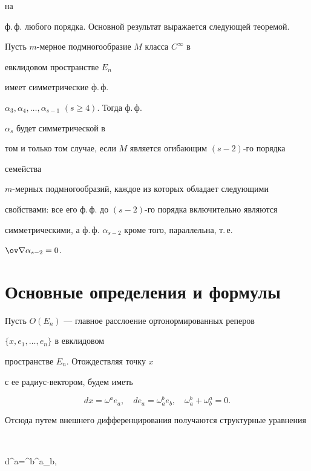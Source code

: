 на 


ф.\,ф. любого порядка. Основной результат выражается следующей теоремой. 


 


\begin{thm} Пусть $m$-мерное подмногообразие $M$ класса $C^\infty$ в 


евклидовом пространстве $E_n$ 


имеет симметрические ф.\,ф. 


$\alpha_3,\alpha_4,\dotsc,\alpha_{s-1}$ $(s\ge 4)$. Тогда ф.\,ф. 


$\alpha_s$ будет симметрической в 


том и только том случае, если $M$ является огибающим $(s-2)$-го порядка 


семейства 


$m$-мерных подмногообразий, каждое из которых обладает следующими 


свойствами: все его ф.\,ф. до $(s-2)$-го порядка включительно являются 


симметрическими, а ф.\,ф. $\alpha_{s-2}$ кроме того, параллельна, т.\,е. 


$\ov\na\alpha_{s-2}=0$. 


\end{thm} 


 


\section{Основные определения и формулы} 


 


Пусть $O(E_n)$ --- главное расслоение ортонормированных реперов 


$\{x,e_1,\dotsc,e_n\}$ в евклидовом 


пространстве $E_n$. Отождествляя точку $x$ 


с ее радиус-вектором, будем иметь 


$$ 


dx=\omega^ae_a,\quad de_a=\omega^b_ae_b,\quad 


\omega^b_a+\omega^a_b=0. 


$$ 


Отсюда путем внешнего дифференцирования получаются структурные уравнения 


$$ 


d\omega^a=\omega^b\wedge\omega^a_b,\quad 


